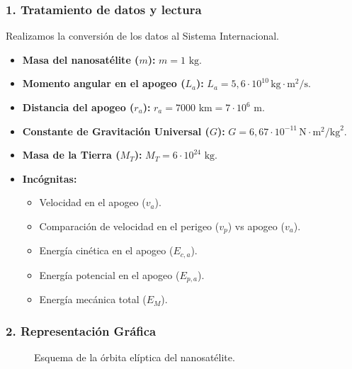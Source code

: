 \subsubsection*{1. Tratamiento de datos y lectura}
Realizamos la conversión de los datos al Sistema Internacional.
\begin{itemize}
    \setlength{\itemsep}{0pt}
    \setlength{\parskip}{0pt}
    \item \textbf{Masa del nanosatélite ($m$):} $m = 1 \text{ kg}$.
    \item \textbf{Momento angular en el apogeo ($L_a$):} $L_a = 5,6 \cdot 10^{10} \, \text{kg}\cdot\text{m}^2/\text{s}$.
    \item \textbf{Distancia del apogeo ($r_a$):} $r_a = 7000 \text{ km} = 7 \cdot 10^6 \text{ m}$.
    \item \textbf{Constante de Gravitación Universal ($G$):} $G = 6,67 \cdot 10^{-11} \, \text{N}\cdot\text{m}^2/\text{kg}^2$.
    \item \textbf{Masa de la Tierra ($M_T$):} $M_T = 6 \cdot 10^{24} \text{ kg}$.
    \item \textbf{Incógnitas:}
    \begin{itemize}
        \setlength{\itemsep}{0pt}
        \item Velocidad en el apogeo ($v_a$).
        \item Comparación de velocidad en el perigeo ($v_p$) vs apogeo ($v_a$).
        \item Energía cinética en el apogeo ($E_{c,a}$).
        \item Energía potencial en el apogeo ($E_{p,a}$).
        \item Energía mecánica total ($E_M$).
    \end{itemize}
\end{itemize}

\subsubsection*{2. Representación Gráfica}
\begin{figure}[H]
    \centering
    \caption{Esquema de la órbita elíptica del nanosatélite.}
\end{figure}

